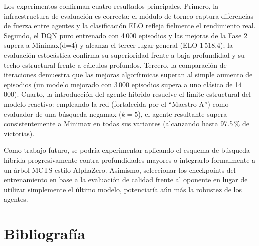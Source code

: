 \documentclass[11pt,a4paper]{article}
\begin{document}
Los experimentos confirman cuatro resultados principales. Primero, la infraestructura de evaluación es correcta: el módulo de torneo captura diferencias de fuerza entre agentes y la clasificación ELO refleja fielmente el rendimiento real. Segundo, el DQN puro entrenado con 4\,000 episodios y las mejoras de la Fase 2 supera a Minimax(d=4) y alcanza el tercer lugar general (ELO 1\,518.4); la evaluación estocástica confirma su superioridad frente a baja profundidad y su techo estructural frente a cálculos profundos. Tercero, la comparación de iteraciones demuestra que las mejoras algorítmicas superan al simple aumento de episodios (un modelo mejorado con 3\,000 episodios supera a uno clásico de 14\,000). Cuarto, la introducción del agente híbrido resuelve el límite estructural del modelo reactivo: empleando la red (fortalecida por el ``Maestro A'') como evaluador de una búsqueda negamax ($k=5$), el agente resultante supera consistentemente a Minimax en todas sus variantes (alcanzando hasta 97.5\,\% de victorias).

Como trabajo futuro, se podría experimentar aplicando el esquema de búsqueda híbrida progresivamente contra profundidades mayores o integrarlo formalmente a un árbol MCTS estilo AlphaZero. Asimismo, seleccionar los checkpoints del entrenamiento en base a la evaluación de calidad frente al oponente en lugar de utilizar simplemente el último modelo, potenciaría aún más la robustez de los agentes.

\section{Bibliografía}
\end{document}
